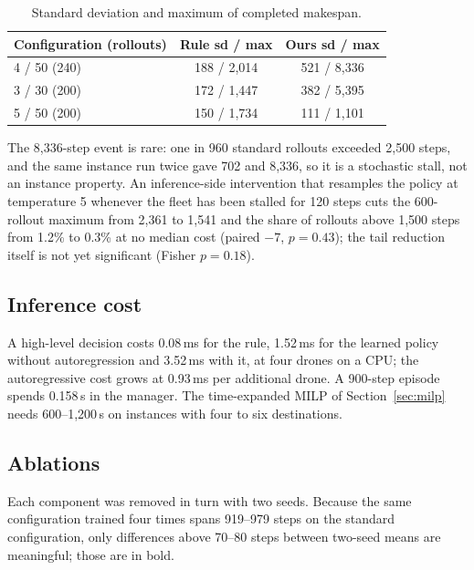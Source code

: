 \documentclass[12pt]{article}
\begin{document}
\begin{table}[h]
\centering
\caption{Standard deviation and maximum of completed makespan.}
\label{tab:tail}
\begin{tabular}{lcc}
\toprule
Configuration (rollouts) & Rule sd / max & Ours sd / max \\
\midrule
4 / 50 (240) & 188 / 2{,}014 & 521 / 8{,}336 \\
3 / 30 (200) & 172 / 1{,}447 & 382 / 5{,}395 \\
5 / 50 (200) & 150 / 1{,}734 & 111 / 1{,}101 \\
\bottomrule
\end{tabular}
\end{table}

The 8{,}336-step event is rare: one in 960 standard rollouts exceeded 2{,}500 steps, and the same
instance run twice gave 702 and 8{,}336, so it is a stochastic stall, not an instance property.
An inference-side intervention that resamples the policy at temperature 5 whenever the fleet has
been stalled for 120 steps cuts the 600-rollout maximum from 2{,}361 to 1{,}541 and the share of
rollouts above 1{,}500 steps from 1.2\% to 0.3\% at no median cost (paired $-7$, $p = 0.43$); the
tail reduction itself is not yet significant (Fisher $p = 0.18$).

\subsection{Inference cost}

A high-level decision costs 0.08\,ms for the rule, 1.52\,ms for the learned policy without
autoregression and 3.52\,ms with it, at four drones on a CPU; the autoregressive cost grows at
0.93\,ms per additional drone. A 900-step episode spends 0.158\,s in the manager. The
time-expanded MILP of Section~\ref{sec:milp} needs 600--1{,}200\,s on instances with four to six
destinations.

\subsection{Ablations}

Each component was removed in turn with two seeds. Because the same configuration trained four
times spans 919--979 steps on the standard configuration, only differences above 70--80 steps
between two-seed means are meaningful; those are in bold.
\end{document}

